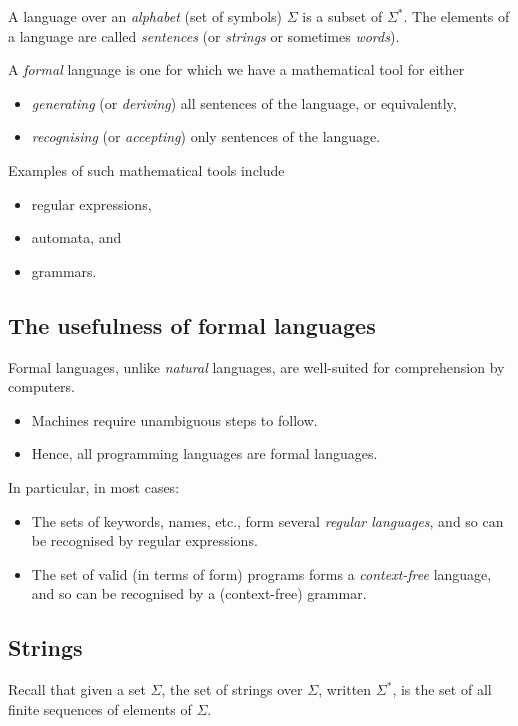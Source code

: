 \documentclass[11pt]{article}
\theoremstyle{definition}
\begin{document}
A language over an \emph{alphabet} (set of symbols) \(Σ\)
is a subset of \(Σ^{*}\).
The elements of a language are called \emph{sentences}
(or \emph{strings} or sometimes \emph{words}).

A \emph{formal} language is one for which we have a mathematical tool
for either
\begin{itemize}
\item \emph{generating} (or \emph{deriving}) all sentences of the language,
or equivalently,
\item \emph{recognising} (or \emph{accepting}) only sentences of the language.
\end{itemize}

Examples of such mathematical tools include
\begin{itemize}
\item regular expressions,
\item automata, and
\item grammars.
\end{itemize}

\subsection{The usefulness of formal languages}
\label{sec:org1144d70}
Formal languages, unlike \emph{natural} languages, are well-suited
for comprehension by computers.
\begin{itemize}
\item Machines require unambiguous steps to follow.
\item Hence, all programming languages are formal languages.
\end{itemize}

In particular, in most cases:
\begin{itemize}
\item The sets of keywords, names, etc., form several \emph{regular languages},
and so can be recognised by regular expressions.
\item The set of valid (in terms of form) programs forms
a \emph{context-free} language, and so can be recognised by
a (context-free) grammar.
\end{itemize}

\subsection{Strings}
\label{sec:orgd0ef5ed}
Recall that given a set \(Σ\), the set of strings over \(Σ\),
written \(Σ^{*}\), is the set of all finite sequences
of elements of \(Σ\).
\end{document}

